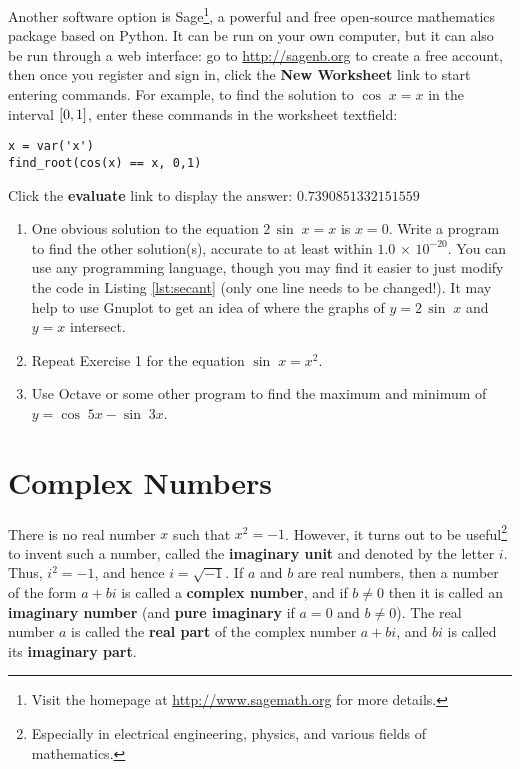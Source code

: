 Another software option is
Sage\footnote{Visit the homepage at \url{http://www.sagemath.org} for more details.}, a
powerful and free open-source mathematics package based on Python. It can be run on your
own computer, but it can also be run through a web interface: go to \url{http://sagenb.org} to
create a free account, then once you register and sign in, click the
\textbf{New Worksheet} link to start entering commands. For example, to find the solution to
$\cos\;x = x$ in the interval $\lbrack 0,1 \rbrack$, enter these commands in the worksheet textfield:

\begin{Verbatim}[frame=single,framesep=1mm]
x = var('x')
find_root(cos(x) == x, 0,1)
\end{Verbatim}

\noindent Click the \textbf{evaluate} link to display the answer: $0.7390851332151559$\vspace{1mm}

\divider
\vspace{2mm}

\startexercises\label{sec6dot2}
\vspace{4mm}
{\small
\begin{enumerate}[\bfseries 1.]
 \item One obvious solution to the equation $2\,\sin\;x = x$ is $x=0$.
 Write a program to find the other solution(s), accurate to at least
 within $1.0 \,\times\, 10^{-20}$. You can use any programming language, though you may find it
 easier to just modify the code in Listing \ref{lst:secant} (only one line needs to be changed!).
 It may help to use Gnuplot to get an idea of where the graphs of $y=2\,\sin\;x$ and $y=x$
 intersect.
 \item Repeat Exercise 1 for the equation $\sin\;x = x^2$.
 \item Use Octave or some other program to find the maximum and minimum of $y=\cos\;5x - \sin\;3x$.
\end{enumerate}}
\newpage
\section{Complex Numbers}
There is no real number $x$ such that $x^2 = -1$. However, it turns out to be
useful\footnote{Especially in electrical engineering, physics, and various fields of mathematics.}
to invent such a
number, called the \textbf{imaginary unit} and denoted by the letter $i$.
Thus, $i^2 = -1$, and hence $i = \sqrt{-1}$. If $a$ and $b$ are real numbers, then a number of the
form $a + bi$ is called a \textbf{complex number}, and if $b \ne 0$ then it
is called an \textbf{imaginary number} (and \textbf{pure
imaginary} if $a=0$ and $b \ne 0$).
The real number $a$ is called the \textbf{real part} of the complex
number $a+bi$, and $bi$ is called its \textbf{imaginary part}.

